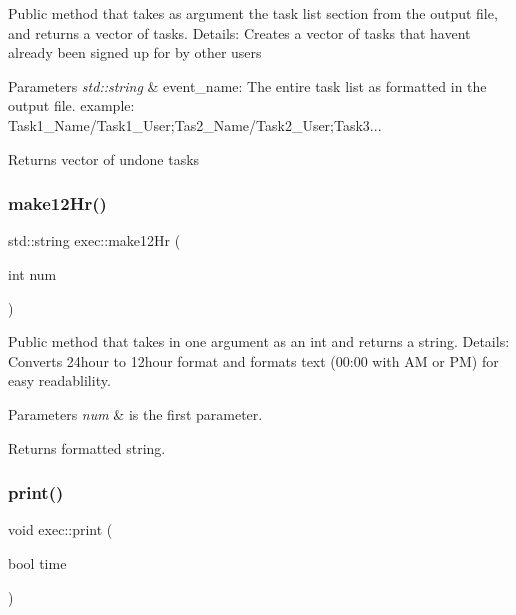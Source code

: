Public method that takes as argument the task list section from the output file, and returns a vector of tasks. Details\+: Creates a vector of tasks that haven\textquotesingle{}t already been signed up for by other users 
\begin{DoxyParams}{Parameters}
{\em std\+::string} & event\+\_\+name\+: The entire task list as formatted in the output file. example\+: Task1\+\_\+\+Name/\+Task1\+\_\+\+User;Tas2\+\_\+\+Name/\+Task2\+\_\+\+User;Task3... \\
\hline
\end{DoxyParams}
\begin{DoxyReturn}{Returns}
vector of undone tasks 
\end{DoxyReturn}
\mbox{\label{classexec_ade14fc20cd40b2d5e3e8e5abbda382d4}} 
\subsubsection{\texorpdfstring{make12\+Hr()}{make12Hr()}}
{\footnotesize\ttfamily std\+::string exec\+::make12\+Hr (\begin{DoxyParamCaption}\item[{int}]{num }\end{DoxyParamCaption})}

Public method that takes in one argument as an int and returns a string. Details\+: Converts 24hour to 12hour format and formats text (00\+:00 with AM or PM) for easy readablility. 
\begin{DoxyParams}{Parameters}
{\em num} & is the first parameter. \\
\hline
\end{DoxyParams}
\begin{DoxyReturn}{Returns}
formatted string. 
\end{DoxyReturn}
\mbox{\label{classexec_a4cf771a565711689023aa75141f82c52}} 
\subsubsection{\texorpdfstring{print()}{print()}}
{\footnotesize\ttfamily void exec\+::print (\begin{DoxyParamCaption}\item[{bool}]{time }\end{DoxyParamCaption})}

